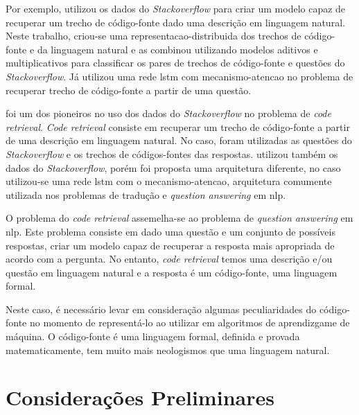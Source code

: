 Por exemplo, \cite{Allamanis-bimodal-source-code-natural-language:2015} utilizou os dados do \textit{Stackoverflow} para criar um \gls{modelo} capaz de recuperar um trecho de código-fonte dado uma descrição em linguagem natural. Neste trabalho, criou-se uma \gls{representacao-distribuida} dos trechos de código-fonte e da linguagem natural e as combinou utilizando modelos aditivos e multiplicativos para classificar os pares de trechos de código-fonte e questões do \textit{Stackoverflow}. Já \cite{iyer-etal-2016-summarizing} utilizou uma rede \acrfull{lstm} com \gls{mecanismo-atencao} no problema de recuperar trecho de código-fonte a partir de uma questão.

\cite{Allamanis-bimodal-source-code-natural-language:2015} foi um dos pioneiros no uso dos dados do \textit{Stackoverflow} no problema de \textit{code retrieval}. \textit{Code retrieval} consiste em recuperar um trecho de código-fonte a partir de uma descrição em linguagem natural. No caso, foram utilizadas as questões do \textit{Stackoverflow} e os trechos de códigos-fontes das respostas. \cite{iyer-etal-2016-summarizing} utilizou também os dados do \textit{Stackoverflow}, porém foi proposta uma arquitetura diferente, no caso utilizou-se uma rede \acrshort{lstm} com o \gls{mecanismo-atencao}, arquitetura comumente utilizada nos problemas de tradução e \textit{question answering} em \acrfull{nlp}. 

O problema do \textit{code retrieval} assemelha-se ao problema de \textit{question answering} em \acrshort{nlp}. Este problema consiste em dado uma questão e um conjunto de possíveis respostas, criar um modelo capaz de recuperar a resposta mais apropriada de acordo com a pergunta. No entanto, \textit{code retrieval} temos uma descrição e/ou questão em linguagem natural e a resposta é um código-fonte, uma linguagem formal.

Neste caso, é necessário levar em consideração algumas peculiaridades do código-fonte no momento de representá-lo ao utilizar em algoritmos de aprendizgame de máquina. O código-fonte é uma linguagem formal, definida e provada matematicamente, tem muito mais neologismos que uma linguagem natural. 








\section{Considerações Preliminares}
\label{sec:consideracoes_preliminares}

